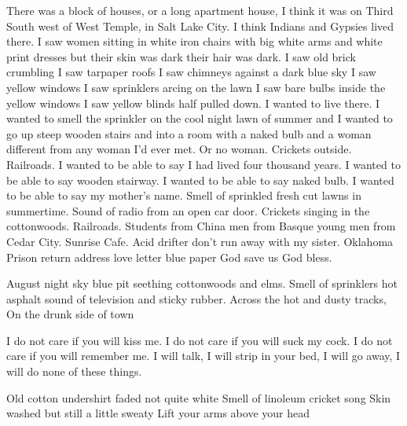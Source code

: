 \documentclass[english,11pt,letterpaper,onecolumn,parskip=full]{scrbook}
\begin{document}
\begin{poem}
\begin{stanza}
There was a block of houses, or a long apartment house, I think it was on Third South west of West Temple, in Salt Lake City.\verseline
I think Indians and Gypsies lived there.  I saw women sitting in white iron chairs with big white arms and white print dresses but their skin was dark their hair was dark.  I saw old brick crumbling I saw tarpaper roofs I saw chimneys against a dark blue sky I saw yellow windows I saw sprinklers arcing on the lawn I saw bare bulbs inside the yellow windows I saw yellow blinds half pulled down.  I wanted to live there.  I wanted to smell the sprinkler on the cool night lawn of summer and I wanted to go up steep wooden stairs and into a room with a naked bulb and a woman different from any woman I'd ever met.  Or no woman.  Crickets outside.  Railroads.\verseline
I wanted to be able to say I had lived four thousand years.  I wanted to be able to say wooden stairway.  I wanted to be able to say naked bulb.  I wanted to be able to say my mother's name.\verseline
Smell of sprinkled fresh cut lawns in summertime.\verseline
Sound of radio from an open car door.\verseline
Crickets singing in the cottonwoods.\verseline
Railroads.\verseline
Students from China men from Basque young men from Cedar City.\verseline
Sunrise Cafe.\verseline
Acid drifter don't run away with my sister.\verseline
Oklahoma Prison return address love letter blue paper God save us God bless.
\end{stanza}

\begin{stanza}
August night sky blue pit seething cottonwoods and elms.\verseline
Smell of sprinklers hot asphalt sound of television and sticky rubber.\verseline
Across the hot and dusty tracks,\verseline
On the drunk side of town
\end{stanza}

\begin{stanza}
I do not care if you will kiss me.\verseline
I do not care if you will suck my cock.\verseline
I do not care if you will remember me.\verseline
I will talk, I will strip in your bed, I will go away, I will do none of these things.
\end{stanza}

\begin{stanza}
Old cotton undershirt faded not quite white\verseline
Smell of linoleum cricket song\verseline
Skin washed but still a little sweaty\verseline
Lift your arms above your head
\end{stanza}


\end{poem}
\end{document}
